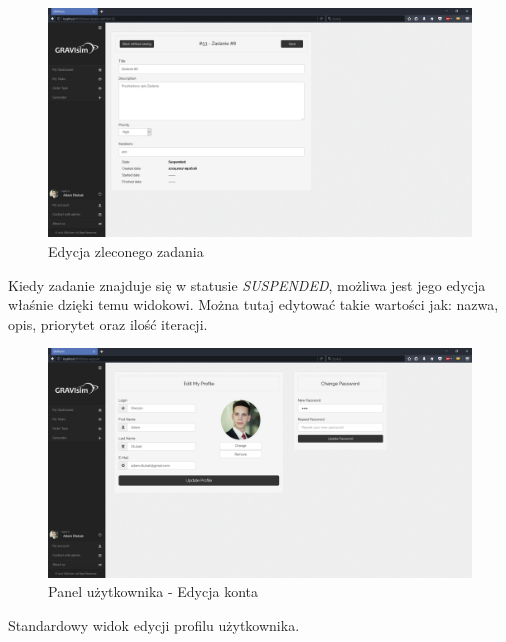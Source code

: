 \documentclass[a4paper,onecolumn,oneside,12pt]{memoir}
\begin{document}
{{\begin{figure}[h]
	\centering
	\includegraphics[width=0.9\linewidth]{pictures/screen-10}
	\caption{Edycja zleconego zadania}
\end{figure}
\vspace*{1mm}
Kiedy zadanie znajduje się w statusie \textit{SUSPENDED}, możliwa jest jego edycja właśnie dzięki temu widokowi. Można tutaj edytować takie wartości jak: nazwa, opis, priorytet oraz ilość iteracji.

\pagebreak
\vspace*{1mm}
\begin{figure}[h!]
	\centering
	\includegraphics[width=0.9\linewidth]{pictures/screen-6}
	\caption{Panel użytkownika - Edycja konta}
\end{figure}
Standardowy widok edycji profilu użytkownika.


}}
\end{document}

